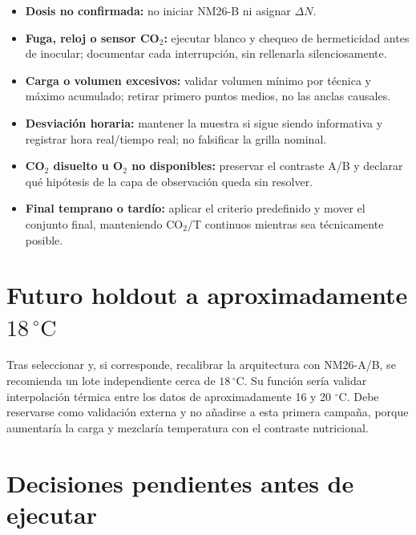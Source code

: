 \documentclass[11pt,a4paper]{article}
\begin{document}
\begin{itemize}[leftmargin=*]
  \item \textbf{Dosis no confirmada:} no iniciar NM26-B ni asignar \(\Delta N\).
  \item \textbf{Fuga, reloj o sensor CO$_2$:} ejecutar blanco y chequeo de
  hermeticidad antes de inocular; documentar cada interrupción, sin rellenarla
  silenciosamente.
  \item \textbf{Carga o volumen excesivos:} validar volumen mínimo por técnica y
  máximo acumulado; retirar primero puntos medios, no las anclas causales.
  \item \textbf{Desviación horaria:} mantener la muestra si sigue siendo
  informativa y registrar hora real/tiempo real; no falsificar la grilla nominal.
  \item \textbf{CO$_2$ disuelto u O$_2$ no disponibles:} preservar el contraste
  A/B y declarar qué hipótesis de la capa de observación queda sin resolver.
  \item \textbf{Final temprano o tardío:} aplicar el criterio predefinido y mover
  el conjunto final, manteniendo CO$_2$/T continuos mientras sea técnicamente
  posible.
\end{itemize}

\section{Futuro holdout a aproximadamente \(18\,^{\circ}\mathrm{C}\)}

Tras seleccionar y, si corresponde, recalibrar la arquitectura con NM26-A/B, se
recomienda un lote independiente cerca de \(18\,^{\circ}\mathrm{C}\). Su función
sería validar interpolación térmica entre los datos de aproximadamente 16 y
20 \(^{\circ}\mathrm{C}\). Debe reservarse como validación externa y no añadirse
a esta primera campaña, porque aumentaría la carga y mezclaría temperatura con el
contraste nutricional.

\section{Decisiones pendientes antes de ejecutar}
\end{document}
